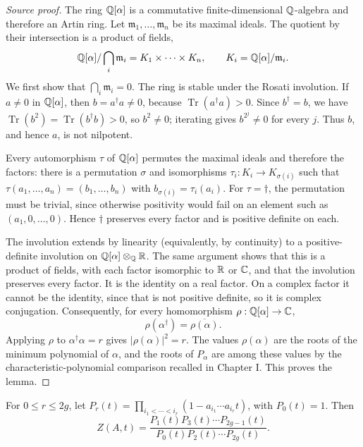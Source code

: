 \begin{proof}[Source proof]

The ring $\mathbb{Q}[\alpha]$ is a commutative finite-dimensional $\mathbb{Q}$-algebra and
therefore an Artin ring.  Let $\mathfrak m_1,\ldots,\mathfrak m_n$ be its
maximal ideals.  The quotient by their intersection is a product of fields,
\[
 \mathbb{Q}[\alpha]/\bigcap_i\mathfrak m_i=K_1\times\cdots\times K_n,
 \qquad K_i=\mathbb{Q}[\alpha]/\mathfrak m_i.
\]
We first show that $\bigcap_i\mathfrak m_i=0$.  The ring is stable under
the Rosati involution.  If $a\ne0$ in $\mathbb{Q}[\alpha]$, then
$b=a^\dagger a\ne0$, because $\operatorname{Tr}(a^\dagger a)>0$.  Since
$b^\dagger=b$, we have
$\operatorname{Tr}(b^2)=\operatorname{Tr}(b^\dagger b)>0$, so $b^2\ne0$;
iterating gives $b^{2^j}\ne0$ for every $j$.  Thus $b$, and hence $a$, is
not nilpotent.

Every automorphism $\tau$ of $\mathbb{Q}[\alpha]$ permutes the maximal ideals and
therefore the factors: there is a permutation $\sigma$ and isomorphisms
$\tau_i:K_i\to K_{\sigma(i)}$ such that
$\tau(a_1,\ldots,a_n)=(b_1,\ldots,b_n)$ with
$b_{\sigma(i)}=\tau_i(a_i)$.  For $\tau=\dagger$, the permutation must be
trivial, since otherwise positivity would fail on an element such as
$(a_1,0,\ldots,0)$.  Hence $\dagger$ preserves every factor and is positive
definite on each.

The involution extends by linearity (equivalently, by continuity) to a
positive-definite involution on $\mathbb{Q}[\alpha]\otimes_{\mathbb{Q}}\mathbb{R}$.  The same argument
shows that this is a product of fields, with each factor isomorphic to $\mathbb{R}$
or $\mathbb{C}$, and that the involution preserves every factor.  It is the identity
on a real factor.  On a complex factor it cannot be the identity, since that
is not positive definite, so it is complex conjugation.  Consequently, for
every homomorphism $\rho:\mathbb{Q}[\alpha]\to\mathbb{C}$,
\[
 \rho(\alpha^\dagger)=\overline{\rho(\alpha)}.
\]
Applying $\rho$ to $\alpha^\dagger\alpha=r$ gives
$|\rho(\alpha)|^2=r$.  The values $\rho(\alpha)$ are the roots of the
minimum polynomial of $\alpha$, and the roots of $P_\alpha$ are among these
values by the characteristic-polynomial comparison recalled in Chapter I.
This proves the lemma.

\end{proof}

\begin{corollary}\label{cor:milne-zeta-function}
For $0\leq r\leq 2g$, let $P_r(t)=\prod_{i_1<\cdots<i_r}(1-a_{i_1}\cdots a_{i_r}t)$, with $P_0(t)=1$. Then
\[
 Z(A,t)=\frac{P_1(t)P_3(t)\cdots P_{2g-1}(t)}
 {P_0(t)P_2(t)\cdots P_{2g}(t)}.
\]
\end{corollary}

